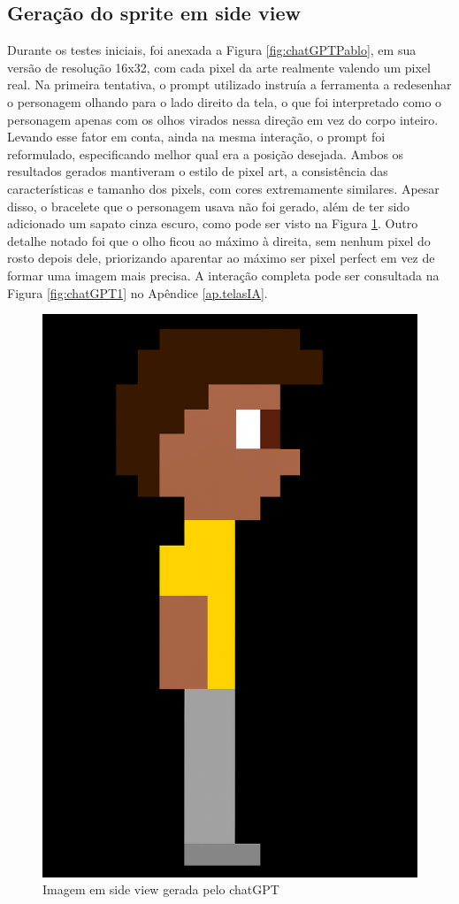 \FloatBarrier
\subsection{Geração do sprite em side view}
\label{s.chatGPT.sideview}

Durante os testes iniciais, foi anexada a Figura \ref{fig:chatGPTPablo}, em sua versão de resolução 16x32, com cada pixel da arte realmente valendo um pixel real. Na primeira tentativa, o prompt utilizado instruía a ferramenta a redesenhar o personagem olhando para o lado direito da tela, o que foi interpretado como o personagem apenas com os olhos virados nessa direção em vez do corpo inteiro. Levando esse fator em conta, ainda na mesma interação, o prompt foi reformulado, especificando melhor qual era a posição desejada. Ambos os resultados gerados mantiveram o estilo de pixel art, a consistência das características e tamanho dos pixels, com cores extremamente similares. Apesar disso, o bracelete que o personagem usava não foi gerado, além de ter sido adicionado um sapato cinza escuro, como pode ser visto na Figura \ref{fig:chatGPTSideViewPixel}. Outro detalhe notado foi que o olho ficou ao máximo à direita, sem nenhum pixel do rosto depois dele, priorizando aparentar ao máximo ser pixel perfect em vez de formar uma imagem mais precisa. A interação completa pode ser consultada na Figura \ref{fig:chatGPT1} no Apêndice \ref{ap.telasIA}.

\begin{figure}[htbp]
    \centering
    \caption{\small Imagem em side view gerada pelo chatGPT }
    \label{fig:chatGPTSideViewPixel}
    \includegraphics[width=0.3\linewidth]{figs/chatGPT/visao_lateral/res2_pixel.png}
\end{figure}

